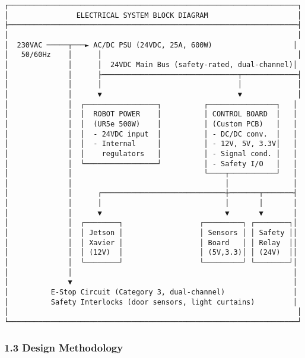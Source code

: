 \documentclass[
]{article}
\begin{document}
\begin{verbatim}
┌────────────────────────────────────────────────────────────────────┐
│                ELECTRICAL SYSTEM BLOCK DIAGRAM                     │
├────────────────────────────────────────────────────────────────────┤
│                                                                    │
│  230VAC ─────┬───► AC/DC PSU (24VDC, 25A, 600W)                   │
│   50/60Hz    │      │                                              │
│              │      │  24VDC Main Bus (safety-rated, dual-channel)│
│              │      ├────────────────────────────────┬─────────────┤
│              │      │                                │             │
│              │      ▼                                ▼             │
│              │  ┌─────────────────┐          ┌────────────────┐   │
│              │  │  ROBOT POWER    │          │ CONTROL BOARD  │   │
│              │  │  (UR5e 500W)    │          │ (Custom PCB)   │   │
│              │  │  - 24VDC input  │          │ - DC/DC conv.  │   │
│              │  │  - Internal     │          │ - 12V, 5V, 3.3V│   │
│              │  │    regulators   │          │ - Signal cond. │   │
│              │  └─────────────────┘          │ - Safety I/O   │   │
│              │                               └────┬───────────┘   │
│              │                                    │               │
│              │      ┌─────────────────────────────┼───────┬───────┤
│              │      │                             │       │       │
│              │      ▼                             ▼       ▼       │
│              │  ┌────────┐                  ┌─────────┐ ┌────────┐│
│              │  │ Jetson │                  │ Sensors │ │ Safety ││
│              │  │ Xavier │                  │ Board   │ │ Relay  ││
│              │  │ (12V)  │                  │ (5V,3.3)│ │ (24V)  ││
│              │  └────────┘                  └─────────┘ └────────┘│
│              │                                                    │
│              ▼                                                    │
│          E-Stop Circuit (Category 3, dual-channel)                │
│          Safety Interlocks (door sensors, light curtains)         │
│                                                                    │
└────────────────────────────────────────────────────────────────────┘
\end{verbatim}

\hypertarget{design-methodology}{%
\subsubsection{1.3 Design Methodology}\label{design-methodology}}
\end{document}
